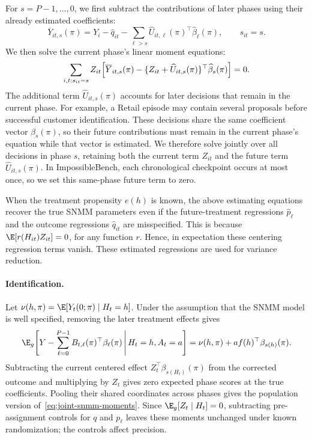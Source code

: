 For $s=P-1,\ldots,0$, we first subtract the contributions of later
phases using their already estimated coefficients:
\begin{equation}
 \overline Y_{it,s}(\pi)
   =Y_i-\widehat q_{it}
     -\sum_{\ell>s}\widehat U_{it,\ell}(\pi)^\top
       \widehat\beta_\ell(\pi),
 \qquad s_{it}=s.
 \label{eq:backward-outcome}
\end{equation}
We then solve the current phase's linear moment equations:
\begin{equation}
 \sum_{i,t:s_{it}=s}Z_{it}
  \Bigl[\overline Y_{it,s}(\pi)
    -\{Z_{it}+\widehat U_{it,s}(\pi)\}^\top
      \widehat\beta_s(\pi)\Bigr]=0.
 \label{eq:phase-moments}
\end{equation}
The additional term $\widehat U_{it,s}(\pi)$ accounts for later
decisions that remain in the current phase. For example, a Retail
episode may contain several proposals before successful customer
identification. These decisions share the same coefficient vector
$\beta_s(\pi)$, so their future contributions must remain in the
current phase's equation while that vector is estimated. We therefore
solve jointly over all decisions in phase $s$, retaining both the
current term $Z_{it}$ and the future term
$\widehat U_{it,s}(\pi)$. In ImpossibleBench, each chronological checkpoint occurs at most once, so we set this same-phase future term to zero.

When the treatment propensity $e(h)$ is known, the above estimating equations recover the true SNMM parameters even if the future-treatment regressions $\widehat p_\ell$ and the outcome regressions $\widehat q_{it}$ are misspecified. This is because $\E[r(H_{it})Z_{it}]=0$, for any function $r$. Hence, in expectation these centering regression terms vanish. These estimated regressions are used for variance reduction.



\paragraph{Identification.}
Let $\nu(h,\pi)=\E[Y_t(0;\pi)\mid H_t=h]$. Under the assumption that the SNMM model is well specified, removing
the later treatment effects gives
\begin{equation}
 \E_g\!\left[Y-\sum_{\ell=0}^{P-1}B_{t,\ell}(\pi)^\top\beta_\ell(\pi)
       \,\middle|\,H_t=h,A_t=a\right]
   =\nu(h,\pi)+a f(h)^\top\beta_{s(h)}(\pi).
 \label{eq:snmm-recursion}
\end{equation}
Subtracting the current centered effect $Z_t^\top\beta_{s(H_t)}(\pi)$ from the
corrected outcome and multiplying by $Z_t$ gives zero expected phase scores at
the true coefficients. Pooling their shared coordinates across phases gives the population
version of~\eqref{eq:joint-snmm-moments}. Since $\E_g[Z_t\mid H_t]=0$, subtracting
pre-assignment controls for $q$ and $p_\ell$ leaves these moments unchanged under
known randomization; the controls affect precision.

